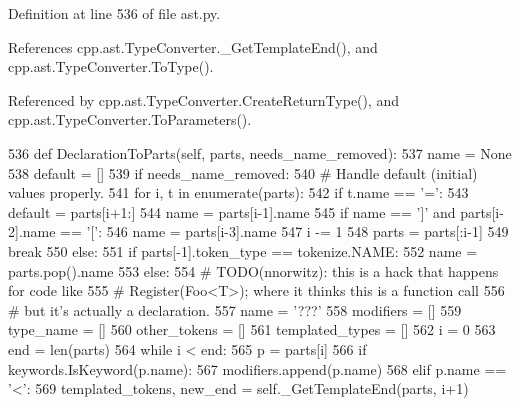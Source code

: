 Definition at line 536 of file ast.\+py.



References cpp.\+ast.\+Type\+Converter.\+\_\+\+Get\+Template\+End(), and cpp.\+ast.\+Type\+Converter.\+To\+Type().



Referenced by cpp.\+ast.\+Type\+Converter.\+Create\+Return\+Type(), and cpp.\+ast.\+Type\+Converter.\+To\+Parameters().


\begin{DoxyCode}
536     \textcolor{keyword}{def }DeclarationToParts(self, parts, needs\_name\_removed):
537         name = \textcolor{keywordtype}{None}
538         default = []
539         \textcolor{keywordflow}{if} needs\_name\_removed:
540             \textcolor{comment}{# Handle default (initial) values properly.}
541             \textcolor{keywordflow}{for} i, t \textcolor{keywordflow}{in} enumerate(parts):
542                 \textcolor{keywordflow}{if} t.name == \textcolor{stringliteral}{'='}:
543                     default = parts[i+1:]
544                     name = parts[i-1].name
545                     \textcolor{keywordflow}{if} name == \textcolor{stringliteral}{']'} \textcolor{keywordflow}{and} parts[i-2].name == \textcolor{stringliteral}{'['}:
546                         name = parts[i-3].name
547                         i -= 1
548                     parts = parts[:i-1]
549                     \textcolor{keywordflow}{break}
550             \textcolor{keywordflow}{else}:
551                 \textcolor{keywordflow}{if} parts[-1].token\_type == tokenize.NAME:
552                     name = parts.pop().name
553                 \textcolor{keywordflow}{else}:
554                     \textcolor{comment}{# TODO(nnorwitz): this is a hack that happens for code like}
555                     \textcolor{comment}{# Register(Foo<T>); where it thinks this is a function call}
556                     \textcolor{comment}{# but it's actually a declaration.}
557                     name = \textcolor{stringliteral}{'???'}
558         modifiers = []
559         type\_name = []
560         other\_tokens = []
561         templated\_types = []
562         i = 0
563         end = len(parts)
564         \textcolor{keywordflow}{while} i < end:
565             p = parts[i]
566             \textcolor{keywordflow}{if} keywords.IsKeyword(p.name):
567                 modifiers.append(p.name)
568             \textcolor{keywordflow}{elif} p.name == \textcolor{stringliteral}{'<'}:
569                 templated\_tokens, new\_end = self.\_GetTemplateEnd(parts, i+1)

\end{DoxyCode}
